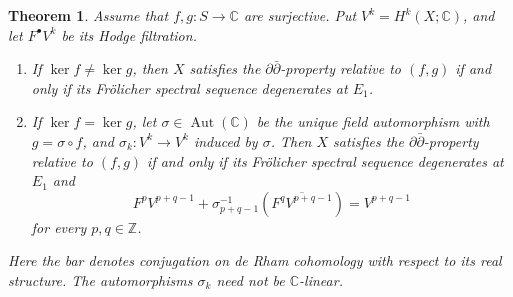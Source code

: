\documentclass[11pt]{amsart}
\numberwithin{equation}{section}
\theoremstyle{plain}
\newtheorem{Th}[thm]{Theorem}
\theoremstyle{definition}
\begin{document}
\begin{Th}\label{thm-relative-ddbar-criterion}
Assume that $f,g:S\longrightarrow\mathbb C$ are surjective. Put
$V^k=H^k(X;\mathbb C)$, and let $F^\bullet V^k$ be its Hodge filtration.
\begin{enumerate}[(1)]
\item\label{thm-relative-ddbar-distinct-kernels} If $\ker f\ne\ker g$, then $X$ satisfies the
$\partial\bar\partial$-property relative to $(f,g)$ if and only if its
Fr\"olicher spectral sequence degenerates at $E_1$.
\item\label{thm-relative-ddbar-equal-kernels} If $\ker f=\ker g$, let $\sigma\in\operatorname{Aut}(\mathbb C)$
be the unique field automorphism with $g=\sigma\circ f$, and
$\sigma_k:V^k\longrightarrow V^k$ induced by $\sigma$. Then $X$ satisfies the $\partial\bar\partial$-property
relative to $(f,g)$ if and only if its Fr\"olicher spectral sequence
degenerates at $E_1$ and
\[
F^pV^{p+q-1}
+\sigma_{p+q-1}^{-1}\!\left(\overline{F^qV^{p+q-1}}\right)
=V^{p+q-1}
\]
for every $p,q\in\mathbb Z$.
\end{enumerate}
Here the bar denotes conjugation on de Rham cohomology with respect to
its real structure. The automorphisms $\sigma_k$ need not be
$\mathbb C$-linear.
\end{Th}
\end{document}
